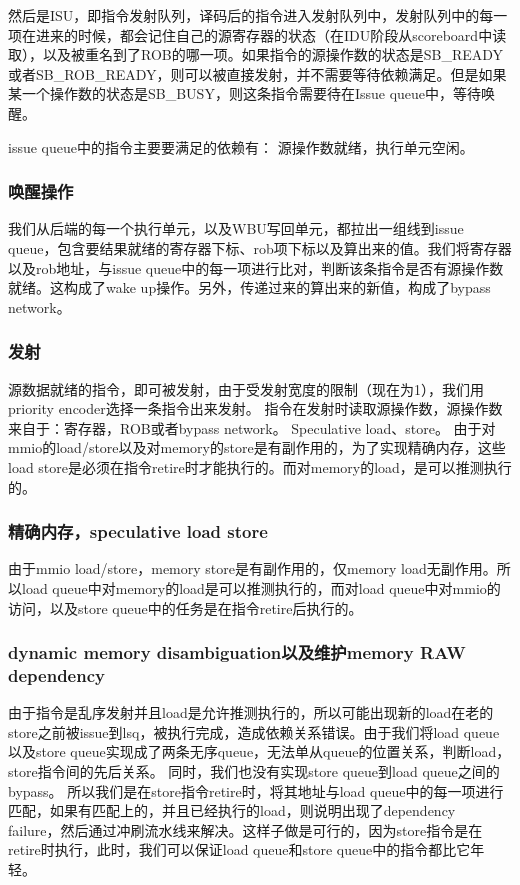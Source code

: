 \documentclass[lang=cn,11pt,a4paper]{elegantpaper}
\begin{document}
然后是ISU，即指令发射队列，译码后的指令进入发射队列中，发射队列中的每一项在进来的时候，都会记住自己的源寄存器的状态（在IDU阶段从scoreboard中读取），以及被重名到了ROB的哪一项。如果指令的源操作数的状态是SB\_READY或者SB\_ROB\_READY，则可以被直接发射，并不需要等待依赖满足。但是如果某一个操作数的状态是SB\_BUSY，则这条指令需要待在Issue queue中，等待唤醒。

issue queue中的指令主要要满足的依赖有：
源操作数就绪，执行单元空闲。

\subsubsection{唤醒操作}
我们从后端的每一个执行单元，以及WBU写回单元，都拉出一组线到issue queue，包含要结果就绪的寄存器下标、rob项下标以及算出来的值。我们将寄存器以及rob地址，与issue queue中的每一项进行比对，判断该条指令是否有源操作数就绪。这构成了wake up操作。另外，传递过来的算出来的新值，构成了bypass network。

\subsubsection{发射}
源数据就绪的指令，即可被发射，由于受发射宽度的限制（现在为1），我们用priority encoder选择一条指令出来发射。
指令在发射时读取源操作数，源操作数来自于：寄存器，ROB或者bypass network。
Speculative load、store。
由于对mmio的load/store以及对memory的store是有副作用的，为了实现精确内存，这些load store是必须在指令retire时才能执行的。而对memory的load，是可以推测执行的。


\subsubsection{精确内存，speculative load store}
由于mmio load/store，memory store是有副作用的，仅memory load无副作用。所以load queue中对memory的load是可以推测执行的，而对load queue中对mmio的访问，以及store queue中的任务是在指令retire后执行的。


\subsubsection{dynamic memory disambiguation以及维护memory RAW dependency}
由于指令是乱序发射并且load是允许推测执行的，所以可能出现新的load在老的store之前被issue到lsq，被执行完成，造成依赖关系错误。由于我们将load queue以及store queue实现成了两条无序queue，无法单从queue的位置关系，判断load，store指令间的先后关系。
同时，我们也没有实现store queue到load queue之间的bypass。
所以我们是在store指令retire时，将其地址与load queue中的每一项进行匹配，如果有匹配上的，并且已经执行的load，则说明出现了dependency failure，然后通过冲刷流水线来解决。这样子做是可行的，因为store指令是在retire时执行，此时，我们可以保证load queue和store queue中的指令都比它年轻。
\end{document}
